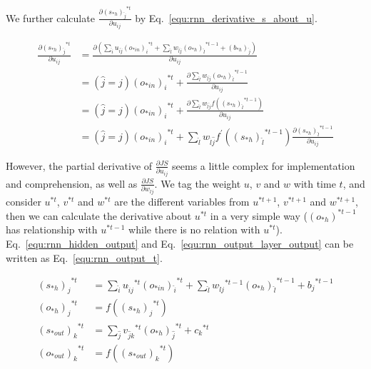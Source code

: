 \documentclass[runningheads,openany]{xhlPaper}
\begin{document}
We further calculate $\frac{{\partial {{\left( {{s_{*h}}} \right)}_{\hat j}}^{*t}}}{{\partial {u_{ij}}}}$ by Eq.~\ref{equ:rnn_derivative_s_about_u}.

\begin{equation}
\label{equ:rnn_derivative_s_about_u}
\begin{aligned}
\frac{{\partial {{\left( {{s_{*h}}} \right)}_{\hat j}}^{*t}}}{{\partial {u_{ij}}}} &= \frac{{\partial \left( {\sum\limits_{\hat i} {{u_{\hat i\hat j}}{{\left( {{o_{*in}}} \right)}_{\hat i}}^{*t}}  + \sum\limits_{\hat l} {{w_{\hat l\hat j}}{{\left( {{o_{*h}}} \right)}_{\hat l}}^{*t - 1}}  + {{\left( {{b_{*h}}} \right)}_{\hat j}}} \right)}}{{\partial {u_{ij}}}}\\
 &= \left( {\hat j = j} \right){\left( {{o_{*in}}} \right)_i}^{*t} + \frac{{\partial \sum\limits_{\hat l} {{w_{\hat l\hat j}}{{\left( {{o_{*h}}} \right)}_{\hat l}}^{*t - 1}} }}{{\partial {u_{ij}}}}\\
 &= \left( {\hat j = j} \right){\left( {{o_{*in}}} \right)_i}^{*t} + \frac{{\partial \sum\limits_{\hat l} {{w_{\hat l\hat j}}f\left( {{{\left( {{s_{*h}}} \right)}_{\hat l}}^{*t - 1}} \right)} }}{{\partial {u_{ij}}}}\\
 &= \left( {\hat j = j} \right){\left( {{o_{*in}}} \right)_i}^{*t} + \sum\limits_{\hat l} {{w_{\hat l\hat j}}{f^{'}}\left( {{{\left( {{s_{*h}}} \right)}_{\hat l}}^{*t - 1}} \right)\frac{{\partial {{\left( {{s_{*h}}} \right)}_{\hat l}}^{*t - 1}}}{{\partial {u_{ij}}}}} 
\end{aligned}
\end{equation}

However, the partial derivative of $\frac{{\partial JS}}{{\partial {u_{ij}}}}$ seems a little complex for implementation and comprehension, as well as $\frac{{\partial JS}}{{\partial {w_{lj}}}}$.
We tag the weight $u$, $v$ and $w$ with time $t$, and consider $u^{*t}$, $v^{*t}$ and $w^{*t}$ are the different variables from $u^{*t + 1}$, $v^{*t + 1}$ and $w^{*t + 1}$, then we can calculate the derivative about $u^{*t}$ in a very simple way (${\left( o_{*h} \right)}^{*t - 1}$ has relationship with $u^{*t - 1}$ while there is no relation with $u^{*t}$).
Eq.~\ref{equ:rnn_hidden_output} and Eq.~\ref{equ:rnn_output_layer_output} can be written as Eq.~\ref{equ:rnn_output_t}.

\begin{equation}
\label{equ:rnn_output_t}
\begin{aligned}
{\left( {{s_{*h}}} \right)_j}^{*t} &= \sum\limits_{\hat i} {{u_{\hat ij}}^{*t}{{\left( {{o_{*in}}} \right)}_{\hat i}}^{*t}}  + \sum\limits_{\hat l} {{w_{\hat lj}}^{*t - 1}{{\left( {{o_{*h}}} \right)}_{\hat l}}^{*t - 1}}  + {b_j}^{*t - 1}\\
{\left( {{o_{*h}}} \right)_j}^{*t} &= f\left( {{{\left( {{s_{*h}}} \right)}_j}^{*t}} \right)\\
{\left( {{s_{*out}}} \right)_k}^{*t} &= \sum\limits_{\hat j} {{v_{\hat jk}}^{*t}{{\left( {{o_{*h}}} \right)}_{\hat j}}^{*t}}  + {c_k}^{*t}\\
{\left( {{o_{*out}}} \right)_k}^{*t} &= f\left( {{{\left( {{s_{*out}}} \right)}_k}^{*t}} \right)
\end{aligned}
\end{equation}
\end{document}
